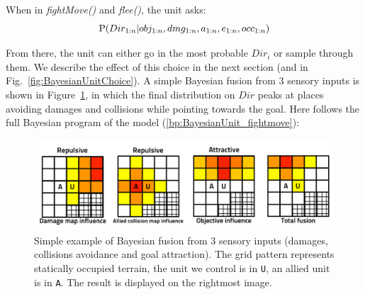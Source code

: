 When in \textit{fightMove()} and \textit{flee()}, the unit asks:
\begin{equation}
\mathrm{P}(Dir_{1:n} | obj_{1:n}, dmg_{1:n}, a_{1:n}, e_{1:n}, occ_{1:n})
\end{equation}

From there, the unit can either go in the most probable $Dir_i$ or sample through them. We describe the effect of this choice in the next section (and in Fig.~\ref{fig:BayesianUnitChoice}). A simple Bayesian fusion from 3 sensory inputs is shown in Figure~\ref{fig:BayesianUnitExample}, in which the final distribution on $Dir$ peaks at places avoiding damages and collisions while pointing towards the goal. Here follows the full Bayesian program of the model (\ref{bp:BayesianUnit_fightmove}):

\begin{figure}[h]
\begin{center}
\includegraphics[width=0.89\columnwidth]{images/example_BayesianUnit.pdf}
\end{center}
\caption{Simple example of Bayesian fusion from 3 sensory inputs (damages, collisions avoidance and goal attraction). The grid pattern represents statically occupied terrain, the unit we control is in \texttt{U}, an allied unit is in \texttt{A}. The result is displayed on the rightmost image.}
\label{fig:BayesianUnitExample}
\end{figure}

